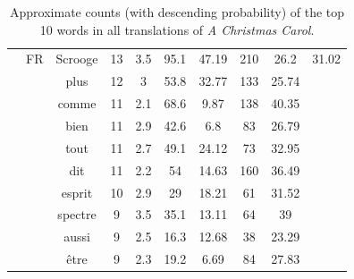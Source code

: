 \documentclass[shortpaper]{revdetua}
\begin{document}
\begin{table}[H]
\begin{tabular}{@{}cccccccccc@{}}
     & \multicolumn{1}{l|}{FR} & Scrooge     & 13           & 3.5              & 95.1         & 47.19   & 210     & 26.2              & 31.02        \\
     & \multicolumn{1}{l|}{}   & plus        & 12           & 3                & 53.8         & 32.77   & 133     & 25.74             &              \\
     & \multicolumn{1}{l|}{}   & comme       & 11           & 2.1              & 68.6         & 9.87    & 138     & 40.35             &              \\
     & \multicolumn{1}{l|}{}   & bien        & 11           & 2.9              & 42.6         & 6.8     & 83      & 26.79             &              \\
     & \multicolumn{1}{l|}{}   & tout        & 11           & 2.7              & 49.1         & 24.12   & 73      & 32.95             &              \\
     & \multicolumn{1}{l|}{}   & dit         & 11           & 2.2              & 54           & 14.63   & 160     & 36.49             &              \\
     & \multicolumn{1}{l|}{}   & esprit      & 10           & 2.9              & 29           & 18.21   & 61      & 31.52             &              \\
     & \multicolumn{1}{l|}{}   & spectre     & 9            & 3.5              & 35.1         & 13.11   & 64      & 39                &              \\
     & \multicolumn{1}{l|}{}   & aussi       & 9            & 2.5              & 16.3         & 12.68   & 38      & 23.29             &              \\
     & \multicolumn{1}{l|}{}   & être        & 9            & 2.3              & 19.2         & 6.69    & 84      & 27.83             &              \\ \bottomrule
\end{tabular}
\caption{Approximate counts (with descending probability) of the top 10 words in all translations of \textit{A Christmas Carol}.}
\end{table}
\end{document}
